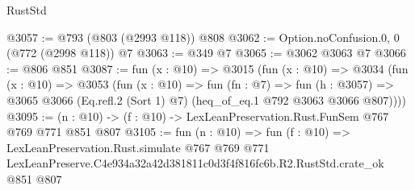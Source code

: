 \begin{lexlean}{RustStd}
\begin{coremodule}
@3057 := @793 (@803 (@2993 @118)) @808
@3062 := Option.noConfusion.{0, 0} (@772 (@2998 @118)) @7
@3063 := @349 @7
@3065 := @3062 @3063 @7
@3066 := @806 @851
@3087 := fun (x : @10) =>
  @3015
    (fun (x : @10) =>
    @3034
      (fun (x : @10) =>
      @3053
        (fun (x : @10) =>
        fun (fn : @7) =>
        fun (h : @3057) =>
        @3065 @3066 (Eq.refl.{2} (Sort 1) @7) (heq_of_eq.{1} @792 @3063 @3066 @807))))
@3095 := (n : @10) -> (f : @10) -> LexLeanPreservation.Rust.FunSem @767 @769 @771 @851 @807
@3105 := fun (n : @10) =>
  fun (f : @10) =>
  LexLeanPreservation.Rust.simulate
    @767
    @769
    @771
    LexLeanPreserve.C4e934a32a42d381811c0d3f4f816fc6b.R2.RustStd.crate_ok
    @851
    @807
\end{coremodule}
\end{lexlean}
